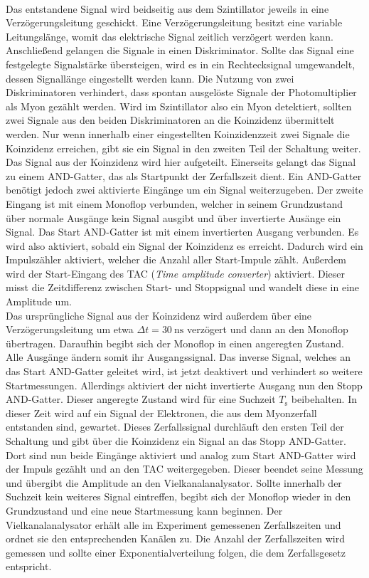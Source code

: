\\
Das entstandene Signal wird beidseitig aus dem Szintillator jeweils in eine Verzögerungsleitung geschickt.
Eine Verzögerungsleitung besitzt eine variable Leitungslänge, womit das elektrische Signal zeitlich verzögert werden kann.
Anschließend gelangen die Signale in einen Diskriminator.
Sollte das Signal eine festgelegte Signalstärke übersteigen, wird es in ein Rechtecksignal umgewandelt, dessen Signallänge eingestellt werden kann.
Die Nutzung von zwei Diskriminatoren verhindert, dass spontan ausgelöste Signale der Photomultiplier als Myon gezählt werden.
Wird im Szintillator also ein Myon detektiert, sollten zwei Signale aus den beiden Diskriminatoren an die Koinzidenz übermittelt werden.
Nur wenn innerhalb einer eingestellten Koinzidenzzeit zwei Signale die Koinzidenz erreichen, gibt sie ein Signal in den zweiten Teil der Schaltung weiter.
\\
Das Signal aus der Koinzidenz wird hier aufgeteilt.
Einerseits gelangt das Signal zu einem AND-Gatter, das als Startpunkt der Zerfallszeit dient.
Ein AND-Gatter benötigt jedoch zwei aktivierte Eingänge um ein Signal weiterzugeben.
Der zweite Eingang ist mit einem Monoflop verbunden, welcher in seinem Grundzustand über normale Ausgänge kein Signal ausgibt und über invertierte Ausänge ein Signal.
Das Start AND-Gatter ist mit einem invertierten Ausgang verbunden.
Es wird also aktiviert, sobald ein Signal der Koinzidenz es erreicht.
Dadurch wird ein Impulszähler aktiviert, welcher die Anzahl aller Start-Impule zählt.
Außerdem wird der Start-Eingang des TAC (\textit{Time amplitude converter}) aktiviert.
Dieser misst die Zeitdifferenz zwischen Start- und Stoppsignal und wandelt diese in eine Amplitude um.
\\
Das ursprüngliche Signal aus der Koinzidenz wird außerdem über eine Verzögerungsleitung um etwa $\Delta t = \qty{30}{\nano\second}$ verzögert und dann an den Monoflop übertragen.
Daraufhin begibt sich der Monoflop in einen angeregten Zustand. 
Alle Ausgänge ändern somit ihr Ausgangssignal.
Das inverse Signal, welches an das Start AND-Gatter geleitet wird, ist jetzt deaktivert und verhindert so weitere Startmessungen.
Allerdings aktiviert der nicht invertierte Ausgang nun den Stopp AND-Gatter.
Dieser angeregte Zustand wird für eine Suchzeit $T_\text{s}$ beibehalten. 
In dieser Zeit wird auf ein Signal der Elektronen, die aus dem Myonzerfall entstanden sind, gewartet.
Dieses Zerfallssignal durchläuft den ersten Teil der Schaltung und gibt über die Koinzidenz ein Signal an das Stopp AND-Gatter.
Dort sind nun beide Eingänge aktiviert und analog zum Start AND-Gatter wird der Impuls gezählt und an den TAC weitergegeben.
Dieser beendet seine Messung und übergibt die Amplitude an den Vielkanalanalysator.
Sollte innerhalb der Suchzeit kein weiteres Signal eintreffen, begibt sich der Monoflop wieder in den Grundzustand und eine neue Startmessung kann beginnen.
Der Vielkanalanalysator erhält alle im Experiment gemessenen Zerfallszeiten und ordnet sie den entsprechenden Kanälen zu.
Die Anzahl der Zerfallszeiten wird gemessen und sollte einer Exponentialverteilung folgen, die dem Zerfallsgesetz entspricht.